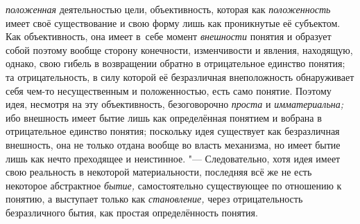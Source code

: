{\em положенная}
деятельностью цели, объективность, которая как
{\em положенность} имеет
своё существование и свою форму лишь как проникнутые её субъектом. Как
объективность, она имеет в~себе момент
{\em внешности} понятия и
образует собой поэтому вообще сторону конечности, изменчивости и явления,
находящую, однако, свою гибель в возвращении обратно в отрицательное
единство понятия; та отрицательность, в силу которой её безразличная
внеположность обнаруживает себя чем-то несущественным и положенностью, есть
само понятие. Поэтому идея, несмотря на эту объективность, безоговорочно
{\em проста} и {\em имматериальна;} ибо
внешность имеет бытие лишь как определённая понятием и вобрана в
отрицательное единство понятия; поскольку идея существует как безразличная
внешность, она не только отдана вообще во власть механизма, но имеет бытие
лишь как нечто преходящее и неистинное. "--- Следовательно,
хотя идея имеет свою реальность в некоторой материальности, последняя всё
же не есть некоторое абстрактное
{\em бытие,}
самостоятельно существующее по отношению к понятию, а
выступает только как {\em становление,}
через отрицательность безразличного бытия, как простая
определённость понятия.

